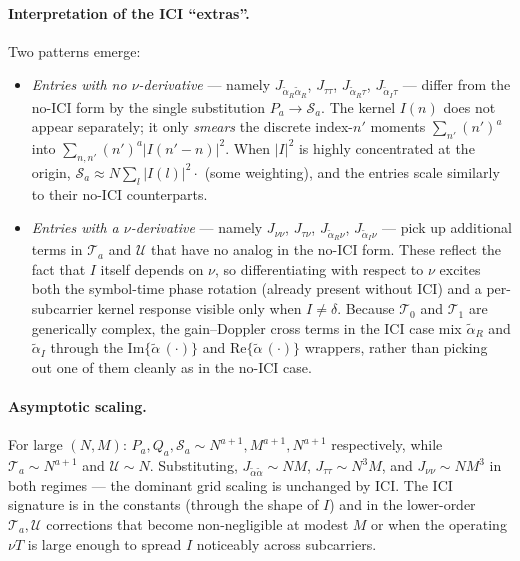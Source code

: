 \documentclass[11pt]{article}
\begin{document}
\paragraph{Interpretation of the ICI ``extras''.} Two patterns emerge:
\begin{itemize}
    \item \emph{Entries with no \(\nu\)-derivative} — namely \(J_{\tilde{\alpha}_R \tilde{\alpha}_R}\), \(J_{\tau\tau}\), \(J_{\tilde{\alpha}_R \tau}\), \(J_{\tilde{\alpha}_I \tau}\) — differ from the no-ICI form by the single substitution \(P_a \to \mathcal{S}_a\). The kernel \(I(n)\) does not appear separately; it only \emph{smears} the discrete index-\(n'\) moments \(\sum_{n'} (n')^a\) into \(\sum_{n,n'} (n')^a |I(n'-n)|^2\). When \(|I|^2\) is highly concentrated at the origin, \(\mathcal{S}_a \approx N \sum_l |I(l)|^2 \cdot \) (some weighting), and the entries scale similarly to their no-ICI counterparts.
    \item \emph{Entries with a \(\nu\)-derivative} — namely \(J_{\nu\nu}\), \(J_{\tau\nu}\), \(J_{\tilde{\alpha}_R \nu}\), \(J_{\tilde{\alpha}_I \nu}\) — pick up additional terms in \(\mathcal{T}_a\) and \(\mathcal{U}\) that have no analog in the no-ICI form. These reflect the fact that \(I\) itself depends on \(\nu\), so differentiating with respect to \(\nu\) excites both the symbol-time phase rotation (already present without ICI) and a per-subcarrier kernel response visible only when \(I \neq \delta\). Because \(\mathcal{T}_0\) and \(\mathcal{T}_1\) are generically complex, the gain--Doppler cross terms in the ICI case mix \(\tilde{\alpha}_R\) and \(\tilde{\alpha}_I\) through the \(\text{Im}\{\tilde{\alpha}\,(\cdot)\}\) and \(\text{Re}\{\tilde{\alpha}\,(\cdot)\}\) wrappers, rather than picking out one of them cleanly as in the no-ICI case.
\end{itemize}

\paragraph{Asymptotic scaling.} For large \((N, M)\): \(P_a, Q_a, \mathcal{S}_a \sim N^{a+1}, M^{a+1}, N^{a+1}\) respectively, while \(\mathcal{T}_a \sim N^{a+1}\) and \(\mathcal{U} \sim N\). Substituting, \(J_{\tilde{\alpha}\tilde{\alpha}} \sim NM\), \(J_{\tau\tau} \sim N^3 M\), and \(J_{\nu\nu} \sim N M^3\) in both regimes — the dominant grid scaling is unchanged by ICI. The ICI signature is in the constants (through the shape of \(I\)) and in the lower-order \(\mathcal{T}_a, \mathcal{U}\) corrections that become non-negligible at modest \(M\) or when the operating \(\nu T\) is large enough to spread \(I\) noticeably across subcarriers.
\end{document}
